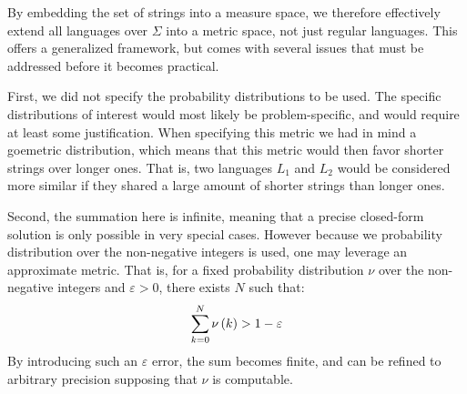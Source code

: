 By embedding the set of strings into a measure space,
we therefore effectively extend all languages over \(\Sigma\)
into a metric space,
not just regular languages.
This offers a generalized framework,
but comes with several issues that must be addressed before
it becomes practical.

First, we did not specify the probability distributions to be used.
The specific distributions of interest would most likely be
problem-specific, and would require at least some justification.
When specifying this metric we had in mind a goemetric distribution,
which means that this metric would then favor shorter strings over longer ones.
That is, two languages \(L_1\) and \(L_2\) would be considered more similar
if they shared a large amount of shorter strings than longer ones.

Second, the summation here is infinite, meaning that a precise closed-form
solution is only possible in very special cases.
However because we probability distribution over the non-negative integers
is used, one may leverage an approximate metric.
That is, for a fixed probability distribution \(\nu\)
over the non-negative integers
and \(\varepsilon > 0\),
there exists \(N\) such that:
\begin{align*}
  \sum_{k = 0}^{N} \nu\left(k\right) > 1 - \varepsilon
\end{align*}
By introducing such an \(\varepsilon\) error,
the sum becomes finite,
and can be refined to arbitrary precision supposing that
\(\nu\) is computable.



